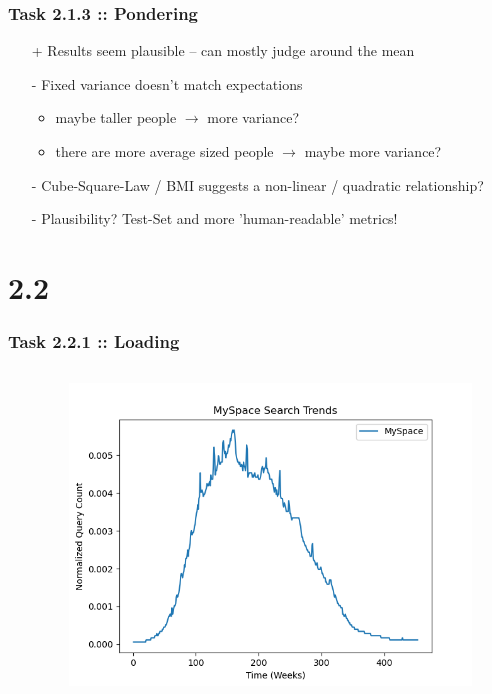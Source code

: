 \documentclass[10pt,aspectratio=169,handout]{beamer}
\begin{document}
\begin{frame}
    \frametitle{Task 2.1.3 :: Pondering}

    \begin{itemize}
        \item[+] Results seem plausible -- can mostly judge around the mean
        \item[-] Fixed variance doesn't match expectations
        \begin{itemize}
            \item maybe taller people $\rightarrow$ more variance?
            \item there are more average sized people $\rightarrow$ maybe more variance? 
        \end{itemize}
        \item[-] Cube-Square-Law / BMI suggests a non-linear / quadratic relationship?
        \item[-]    Plausibility? Test-Set and more 'human-readable' metrics!
    \end{itemize}
\end{frame}

\section{2.2}
\begin{frame}
    \frametitle{Task 2.2.1 :: Loading}
    \begin{columns}
    \begin{column}{0.6\textwidth}
        \inputminted[bgcolor=LightGray,fontsize=\small]{python}{code/myspace-pre.py}
    \end{column}
    \begin{column}{0.4\textwidth}
        \begin{figure}
            \includegraphics[width=\textwidth]{images/myspace.png}
        \end{figure}
    \end{column}
    \end{columns}
\end{frame}
\end{document}
